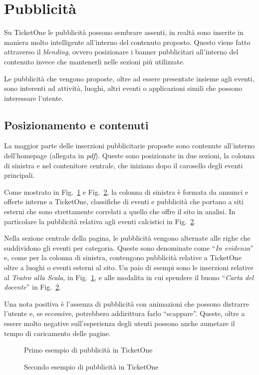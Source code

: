 \section{Pubblicità}\label{pubblicita}

Su TicketOne le pubblicità possono sembrare assenti, in realtà sono inserite in maniera molto intelligente all'interno del contenuto proposto.
Questo viene fatto attraverso il \textit{blending}, ovvero posizionare i banner pubblicitari all'interno del contenuto invece che mantenerli nelle sezioni più utilizzate.
\par Le pubblicità che vengono proposte, oltre ad essere presentate insieme agli eventi, sono interenti ad attività, luoghi, altri eventi o applicazioni simili che possono interessare l'utente.

\subsection{Posizionamento e contenuti}

	La maggior parte delle inserzioni pubblicitarie proposte sono contenute all'interno dell'homepage (allegata in \textit{pdf}).
	Queste sono posizionate in due sezioni, la colonna di sinistra e nel contenitore centrale, che iniziano dopo il carosello degli eventi principali.
	\par Come mostrato in Fig.~\ref{fig:pub1} e Fig.~\ref{fig:pub2}, la colonna di sinistra è formata da annunci e offerte interne a TicketOne, classifiche di eventi e pubblicità che portano a siti esterni che sono strettamente correlati a quello che offre il sito in analisi.
	In particolare la pubblicità relativa agli eventi calcistici in Fig.~\ref{fig:pub2}.
	\par Nella sezione centrale della pagina, le pubblicità vengono alternate alle righe che suddividono gli eventi per categoria.
	Queste sono denominate come ``\textit{In evidenza}'' e, come per la colonna di sinistra, contengono pubblicità relative a TicketOne oltre a luoghi o eventi esterni al sito.
	Un paio di esempi sono le inserzioni relative al \textit{Teatro alla Scala}, in Fig.~\ref{fig:pub1}, e alle modalita in cui spendere il buono ``\textit{Carta del docente}'' in Fig.~\ref{fig:pub2}.
	\par Una nota positiva è l'assenza di pubblicità con animazioni che possono distrarre l'utente e, se eccessive, potrebbero addirittura farlo ``scappare''.
	Queste, oltre a essere molto negative sull'esperienza degli utenti possono anche aumetare il tempo di caricamento delle pagine.

\begin{figure}
	\caption{Primo esempio di pubblicità in TicketOne}
	\label{fig:pub1}
\end{figure}

\begin{figure}
	\caption{Secondo esempio di pubblicità in TicketOne}
	\label{fig:pub2}
\end{figure}